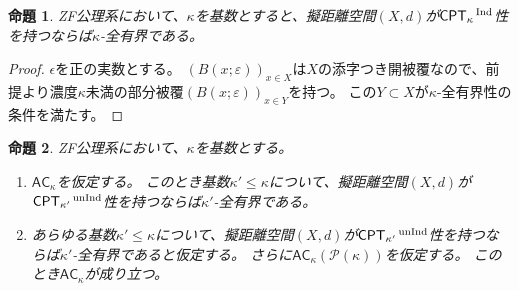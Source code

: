 \documentclass{jarticle}
\newtheorem{proposition}{命題}
\newcommand{\WithIndex}[1]{$\textrm{#1}{}^{\,\textrm{\scriptsize Ind}}$}
\newcommand{\WithoutIndex}[1]{$\textrm{#1}{}^{\,\textrm{\scriptsize unInd}}$}
\begin{document}
\begin{proposition}
\label{prop:totally-bounded_and_Ind-compact}
ZF公理系において、$\kappa$を基数とすると、擬距離空間$(X,d)$が\WithIndex{$\mathsf{CPT}_{\kappa}$}性を持つならば$\kappa$-全有界である。
\end{proposition}
\begin{proof}
$\epsilon$を正の実数とする。
$(B(x;\varepsilon))_{x \in X}$は$X$の添字つき開被覆なので、前提より濃度$\kappa$未満の部分被覆$(B(x;\varepsilon))_{x \in Y}$を持つ。
この$Y \subset X$が$\kappa$-全有界性の条件を満たす。
\end{proof}

\begin{proposition}
\label{prop:totally-bounded_and_unInd-compact}
ZF公理系において、$\kappa$を基数とする。
\begin{enumerate}
\item
$\mathsf{AC}_{\kappa}$を仮定する。
このとき基数$\kappa' \leq \kappa$について、擬距離空間$(X,d)$が\WithoutIndex{$\mathsf{CPT}_{\kappa'}$}性を持つならば$\kappa'$-全有界である。
\item
あらゆる基数$\kappa' \leq \kappa$について、擬距離空間$(X,d)$が\WithoutIndex{$\mathsf{CPT}_{\kappa'}$}性を持つならば$\kappa'$-全有界であると仮定する。
さらに$\mathsf{AC}_{\kappa}(\mathcal{P}(\kappa))$を仮定する。
このとき$\mathsf{AC}_{\kappa}$が成り立つ。
\end{enumerate}
\end{proposition}
\end{document}
